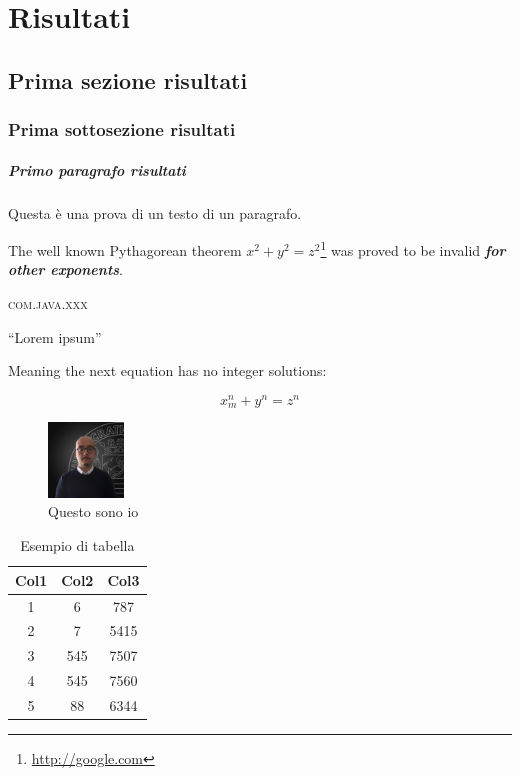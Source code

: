 \chapter{Risultati} %
%


\section{Prima sezione risultati}

\subsection{Prima sottosezione risultati}

\paragraph{Primo paragrafo risultati} Questa è una prova di un testo di un paragrafo.

The well known Pythagorean theorem $x^2 + y^2 = z^2$\footnote{\url{http://google.com}} was 
proved to be invalid \textbf{\textit{for other exponents}}. 

\textsc{com.java.xxx}

``Lorem ipsum''~\cite{di2017developer}

Meaning the next equation has no integer solutions:

\[ x^n_m + y^n = z^n \]

\begin{figure}[h]
\includegraphics[width=2cm]{immagini/picture_unisa.jpg}
\centering
\caption{Questo sono io}
\end{figure}

\begin{center}
\begin{table}[!h]
\begin{tabular}{||c c c ||}
 \hline
 Col1 & Col2 & Col3 \\ [0.5ex] 
 \hline\hline
 1 & 6 & 787 \\ 
 \hline
 2 & 7 & 5415 \\
 \hline
 3 & 545 & 7507 \\
 \hline
 4 & 545 & 7560 \\
 \hline
 5 & 88 & 6344 \\ [1ex] 
 \hline
\end{tabular}
\caption{Esempio di tabella}
\end{table}
\end{center}

